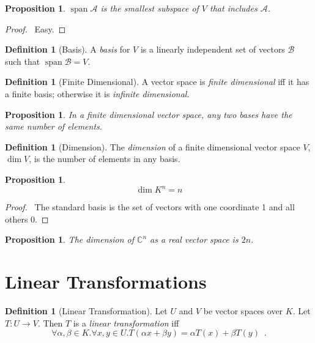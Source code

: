 \documentclass{book}
\let\qed\relax
\newtheorem{prop}[ax]{Proposition}
\theoremstyle{definition}
\newtheorem{df}[ax]{Definition}
\newcommand{\spn}{\ensuremath{\operatorname{span}}}
\begin{document}
\begin{prop}
$\spn \mathcal{A}$ is the smallest subspace of $V$ that includes $\mathcal{A}$.
\end{prop}

\begin{proof}
\pf\ Easy. \qed
\end{proof}

\begin{df}[Basis]
A \emph{basis} for $V$ is a linearly independent set of vectors $\mathcal{B}$ such that $\spn \mathcal{B} = V$.
\end{df}

\begin{df}[Finite Dimensional]
A vector space is \emph{finite dimensional} iff it has a finite basis; otherwise it is \emph{infinite dimensional}.
\end{df}

\begin{prop}
In a finite dimensional vector space, any two bases have the same number of elements.
\end{prop}


\begin{df}[Dimension]
The \emph{dimension} of a finite dimensional vector space $V$, $\dim V$, is the number of elements in any basis.
\end{df}

\begin{prop}
\[ \dim K^n = n \]
\end{prop}

\begin{proof}
\pf\ The standard basis is the set of vectors with one coordinate 1 and all others 0. \qed
\end{proof}

\begin{prop}
The dimension of $\mathbb{C}^n$ as a real vector space is $2n$.
\end{prop}

\section{Linear Transformations}

\begin{df}[Linear Transformation]
Let $U$ and $V$ be vector spaces over $K$. Let $T : U \rightarrow V$. Then $T$ is a \emph{linear transformation} iff
\[ \forall \alpha, \beta \in K. \forall x,y \in U. T(\alpha x + \beta y) = \alpha T(x) + \beta T(y) \enspace . \]
\end{df}
\end{document}
